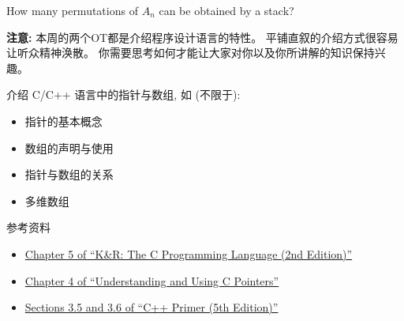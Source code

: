 \documentclass[a4paper, justified]{tufte-handout}
\begin{document}
\begin{solution}
\end{solution}

\beginoptional

\begin{problem}
  How many permutations of $A_n$ can be obtained by a stack?
\end{problem}

\begin{solution}
\end{solution}

\beginot

{\bf 注意:} 本周的两个OT都是介绍程序设计语言的特性。
平铺直叙的介绍方式很容易让听众精神涣散。
你需要思考如何才能让大家对你以及你所讲解的知识保持兴趣。

\begin{ot}
  介绍 C/C++ 语言中的指针与数组, 如 (不限于):
  \begin{itemize}
    \item 指针的基本概念
    \item 数组的声明与使用
    \item 指针与数组的关系
    \item 多维数组
  \end{itemize}

  \noindent 参考资料
  \begin{itemize}
    \item \href{http://cslabcms.nju.edu.cn/problem\_solving/images/c/cc/The\_C\_Programming\_Language\_\%282nd\_Edition\_Ritchie\_Kernighan\%29.pdf}{Chapter 5 of ``K\&R: The C Programming Language (2nd Edition)''}
    \item \href{http://cslabcms.nju.edu.cn/problem\_solving/images/5/53/Understanding\_and\_Using\_C\_Pointers\_\%28Richard\_Reese\%29.pdf}{Chapter 4 of ``Understanding and Using C Pointers''}
    \item \href{http://ptgmedia.pearsoncmg.com/images/9780321714114/samplepages/0321714113.pdf}{Sections 3.5 and 3.6 of ``C++ Primer (5th Edition)''}
  \end{itemize}
\end{ot}
\end{document}
